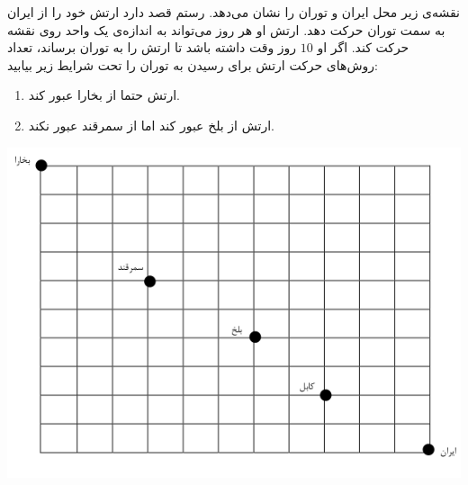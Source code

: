 \EXERCISE
نقشه‌ی زیر محل ایران و توران را نشان می‌دهد. رستم قصد دارد ارتش خود را از ایران به سمت توران حرکت دهد. ارتش او هر روز می‌تواند به اندازه‌ی یک واحد روی نقشه حرکت کند. اگر او
$10$
روز وقت داشته باشد تا ارتش را به توران برساند، تعداد روش‌های حرکت ارتش برای رسیدن به توران را تحت شرایط زیر بیابید:
\begin{enumerate}
\item
ارتش حتما از بخارا عبور کند.
\item
ارتش از بلخ عبور کند اما از سمرقند عبور نکند.
\end{enumerate}
    \begin{center}
     	\includegraphics[scale=0.2]{./13.png}
    \end{center}